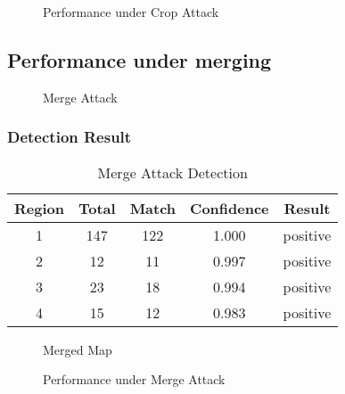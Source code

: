 \documentclass[
	paper=128mm:96mm,	%
	fontsize=11pt,					%
	pagesize,							%
	parskip=half-,					%
	numbers=noendperiod,	%
	captions=nooneline			%
	]{scrartcl}							%
\theoremstyle{mythmstyle}
\begin{document}
\begin{figure}[h]
\centering
{}
\caption{Performance under Crop Attack}
\end{figure}
\clearpage


\subsection*{Performance under merging}
\begin{figure}[h]
\centering
\label{fig:mattack}
\caption{Merge Attack}
\end{figure}
\clearpage
\subsubsection*{Detection Result}
\begin{table}[th]
\centering
\label{tab:merge}
\begin{tabular}{|c||c|c|c|c|} 
\hline
Region & Total & Match & Confidence & Result \\\hline \hline
1 & 147 & 122 & 1.000 & positive\\\hline
2 & 12 & 11 & 0.997 & positive\\\hline
3 & 23 & 18 & 0.994 & positive\\\hline
4 & 15 & 12 & 0.983 & positive\\\hline
\end{tabular}
\caption{Merge Attack Detection}
\end{table}
\clearpage


\begin{figure}[h]
\centering
\label{fig:mresult}
\caption{Merged Map}
\end{figure}
\clearpage

\begin{figure}[h]
\centering
{}
\caption{Performance under Merge Attack}
\end{figure}
\end{document}
